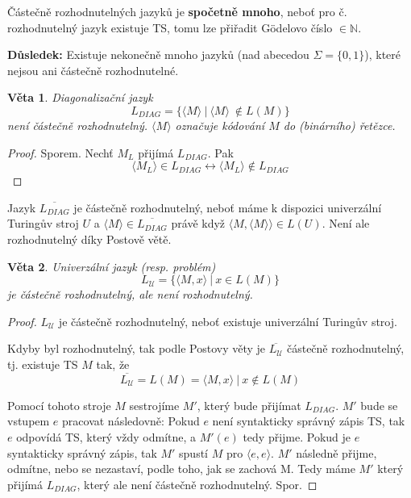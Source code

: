 \documentclass[11pt]{report} %
\newcommand{\N}{\mathbb{N}}
\newtheorem{theorem}{Věta}[section]
\numberwithin{equation}{section}
\begin{document}
Částečně rozhodnutelných jazyků je \textbf{spočetně mnoho}, neboť pro č. rozhodnutelný jazyk existuje TS, tomu lze přiřadit Gödelovo číslo $\in \N$. 

\textbf{Důsledek:} Existuje nekonečně mnoho jazyků (nad abecedou $\Sigma = \{0,1\}$), které nejsou ani částečně rozhodnutelné.

\begin{theorem}
Diagonalizační jazyk 
	$$L_{DIAG} = \{\langle M \rangle\ |\ \langle M \rangle\ \notin L(M)\}$$
není částečně rozhodnutelný. $\langle M \rangle$ označuje kódování $M$ do (binárního) řetězce.
\end{theorem}
\begin{proof}
Sporem. Nechť $M_L$ přijímá $L_{DIAG}$. Pak 
$$\langle M_L \rangle \in L_{DIAG} \leftrightarrow \langle M_L \rangle \notin L_{DIAG}$$
\end{proof}

Jazyk $\overline{L_{DIAG}}$ je částečně rozhodnutelný, neboť máme k dispozici univerzální Turingův stroj $U$ a $\langle M \rangle \in \overline{L_{DIAG}}$ právě když $\langle M, \langle M \rangle\rangle \in L(U)$. Není ale rozhodnutelný díky Postově větě.

\begin{theorem}
Univerzální jazyk (resp. problém) 
$$L_\mathcal{U} = \{\langle M, x\rangle\ |\ x \in L(M) \}$$
je částečně rozhodnutelný, ale není rozhodnutelný.
\end{theorem}
\begin{proof}
$L_\mathcal{U}$ je částečně rozhodnutelný, neboť existuje univerzální Turingův stroj.

Kdyby byl rozhodnutelný, tak podle Postovy věty je $\overline{L_\mathcal{U}}$ částečně rozhodnutelný, tj. existuje TS $M$ tak, že 
$$\overline{L_\mathcal{U}} = L(M) = {\langle M,x\rangle\ |\ x \notin L(M)}$$

Pomocí tohoto stroje $M$ sestrojíme $M'$, který bude přijímat $L_{DIAG}$. $M'$ bude se vstupem $e$ pracovat následovně: Pokud $e$ není syntakticky správný zápis TS, tak $e$ odpovídá TS, který vždy odmítne, a $M'(e)$ tedy přijme. Pokud je $e$ syntakticky správný zápis, tak $M'$ spustí $M$ pro $\langle e,e\rangle$. $M'$ následně přijme, odmítne, nebo se nezastaví, podle toho, jak se zachová M. Tedy máme $M'$ který přijímá $L_{DIAG}$, který ale není částečně rozhodnutelný. Spor.
\end{proof}
\end{document}
